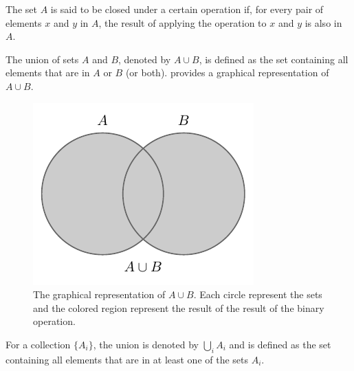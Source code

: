 \begin{definition}[Closure]
	The set $A$ is said to be closed under a certain operation if, for every pair of elements $x$ and $y$ in $A$, the result of applying the operation to $x$ and $y$ is also in $A$.
\end{definition}

\begin{definition}[Union]
	The union of sets $A$ and $B$, denoted by $A \cup B$, is defined as the set containing all elements that are in $A$ or $B$ (or both).  provides a graphical representation of $A \cup B$.
	\begin{figure}[h]
		\centering
		\includegraphics[]{figures/set_union.pdf}
		\caption{The graphical representation of $A\cup B$. Each circle represent the sets and the colored region represent the result of the result of the binary operation.}
		\label{fig:set_union}
	\end{figure}
\end{definition}

\begin{definition}
	For a collection $\{A_i\}$, the union is denoted by $\bigcup_{i} A_i$ and is defined as the set containing all elements that are in at least one of the sets $A_i$.
\end{definition}

